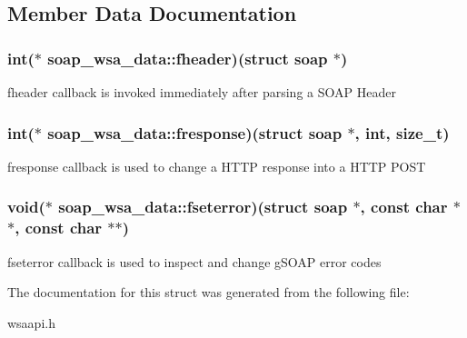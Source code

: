 \subsection{Member Data Documentation}
\hypertarget{structsoap__wsa__data_a22ab7db8c4963c3a65c7770791c84297}{
\subsubsection[{fheader}]{\setlength{\rightskip}{0pt plus 5cm}int($\ast$ {\bf soap\_\-wsa\_\-data::fheader})(struct soap $\ast$)}}
\label{structsoap__wsa__data_a22ab7db8c4963c3a65c7770791c84297}
fheader callback is invoked immediately after parsing a SOAP Header \hypertarget{structsoap__wsa__data_ae6add454e2675015b08fccd0720978ff}{
\subsubsection[{fresponse}]{\setlength{\rightskip}{0pt plus 5cm}int($\ast$ {\bf soap\_\-wsa\_\-data::fresponse})(struct soap $\ast$, int, size\_\-t)}}
\label{structsoap__wsa__data_ae6add454e2675015b08fccd0720978ff}
fresponse callback is used to change a HTTP response into a HTTP POST \hypertarget{structsoap__wsa__data_a6e6dc7ea6bc3b4c4cf170b59b4fb7720}{
\subsubsection[{fseterror}]{\setlength{\rightskip}{0pt plus 5cm}void($\ast$ {\bf soap\_\-wsa\_\-data::fseterror})(struct soap $\ast$, const char $\ast$$\ast$, const char $\ast$$\ast$)}}
\label{structsoap__wsa__data_a6e6dc7ea6bc3b4c4cf170b59b4fb7720}
fseterror callback is used to inspect and change gSOAP error codes 

The documentation for this struct was generated from the following file:\begin{DoxyCompactItemize}
\item 
wsaapi.h\end{DoxyCompactItemize}
